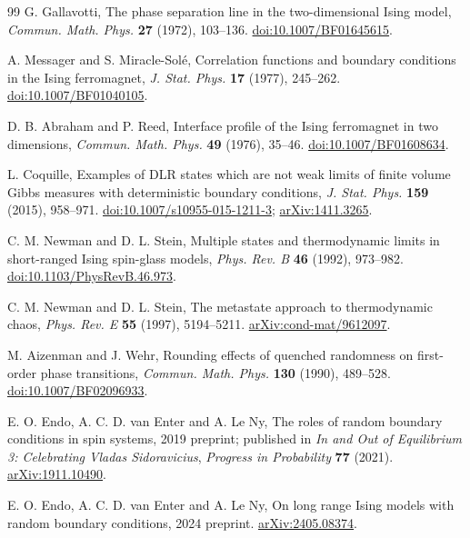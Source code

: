 \begin{thebibliography}{99}
G. Gallavotti,
The phase separation line in the two-dimensional Ising model,
\emph{Commun. Math. Phys.} \textbf{27} (1972), 103--136.
\href{https://doi.org/10.1007/BF01645615}{doi:10.1007/BF01645615}.

A. Messager and S. Miracle-Sol\'e,
Correlation functions and boundary conditions in the Ising ferromagnet,
\emph{J. Stat. Phys.} \textbf{17} (1977), 245--262.
\href{https://doi.org/10.1007/BF01040105}{doi:10.1007/BF01040105}.

D. B. Abraham and P. Reed,
Interface profile of the Ising ferromagnet in two dimensions,
\emph{Commun. Math. Phys.} \textbf{49} (1976), 35--46.
\href{https://doi.org/10.1007/BF01608634}{doi:10.1007/BF01608634}.

L. Coquille,
Examples of DLR states which are not weak limits of finite volume Gibbs measures with deterministic boundary conditions,
\emph{J. Stat. Phys.} \textbf{159} (2015), 958--971.
\href{https://doi.org/10.1007/s10955-015-1211-3}{doi:10.1007/s10955-015-1211-3};
\href{https://arxiv.org/abs/1411.3265}{arXiv:1411.3265}.

C. M. Newman and D. L. Stein,
Multiple states and thermodynamic limits in short-ranged Ising spin-glass models,
\emph{Phys. Rev. B} \textbf{46} (1992), 973--982.
\href{https://doi.org/10.1103/PhysRevB.46.973}{doi:10.1103/PhysRevB.46.973}.

C. M. Newman and D. L. Stein,
The metastate approach to thermodynamic chaos,
\emph{Phys. Rev. E} \textbf{55} (1997), 5194--5211.
\href{https://arxiv.org/abs/cond-mat/9612097}{arXiv:cond-mat/9612097}.

M. Aizenman and J. Wehr,
Rounding effects of quenched randomness on first-order phase transitions,
\emph{Commun. Math. Phys.} \textbf{130} (1990), 489--528.
\href{https://doi.org/10.1007/BF02096933}{doi:10.1007/BF02096933}.

E. O. Endo, A. C. D. van Enter and A. Le Ny,
The roles of random boundary conditions in spin systems,
2019 preprint; published in \emph{In and Out of Equilibrium 3: Celebrating Vladas Sidoravicius},
\emph{Progress in Probability} \textbf{77} (2021).
\href{https://arxiv.org/abs/1911.10490}{arXiv:1911.10490}.

E. O. Endo, A. C. D. van Enter and A. Le Ny,
On long range Ising models with random boundary conditions,
2024 preprint.
\href{https://arxiv.org/abs/2405.08374}{arXiv:2405.08374}.
\end{thebibliography}

